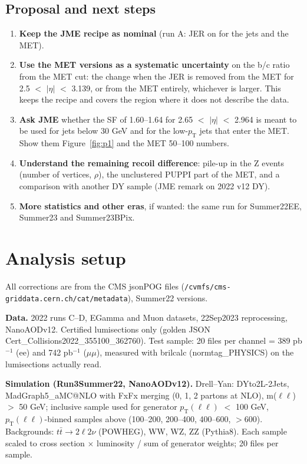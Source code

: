 \documentclass[11pt,a4paper]{article}
\newcommand{\pt}{$p_\mathrm{T}$}
\newcommand{\aeta}{$|\eta|$}
\begin{document}
\subsection{Proposal and next steps}
\begin{enumerate}
\item \textbf{Keep the JME recipe as nominal} (run A: JER on for the jets and the MET).
\item \textbf{Use the MET versions as a systematic uncertainty} on the b/c ratio from the MET cut: the change when the JER is removed
from the MET for 2.5 $<$ \aeta{} $<$ 3.139, or from the MET entirely, whichever is larger. This keeps the recipe and covers the region
where it does not describe the data.
\item \textbf{Ask JME} whether the SF of 1.60--1.64 for 2.65 $<$ \aeta{} $<$ 2.964 is meant to be used for jets below 30 GeV and for
the low-\pt{} jets that enter the MET. Show them Figure~\ref{fig:p1} and the MET 50--100 numbers.
\item \textbf{Understand the remaining recoil difference}: pile-up in the Z events (number of vertices, $\rho$), the unclustered PUPPI part
of the MET, and a comparison with another DY sample (JME remark on 2022 v12 DY).
\item \textbf{More statistics and other eras}, if wanted: the same run for Summer22EE, Summer23 and Summer23BPix.
\end{enumerate}

\appendix
\sloppy
\section{Analysis setup}
\label{app:setup}
All corrections are from the CMS jsonPOG files (\texttt{/cvmfs/cms-griddata.cern.ch/cat/metadata}), Summer22 versions.

\textbf{Data.} 2022 runs C--D, EGamma and Muon datasets, 22Sep2023 reprocessing, NanoAODv12. Certified lumisections only (golden JSON
Cert\_Collisions2022\_355100\_362760). Test sample: 20 files per channel = 389 pb$^{-1}$ (ee) and 742 pb$^{-1}$ ($\mu\mu$), measured with
brilcalc (normtag\_PHYSICS) on the lumisections actually read.

\textbf{Simulation (Run3Summer22, NanoAODv12).} Drell--Yan: DYto2L-2Jets, MadGraph5\_aMC@NLO with FxFx merging (0, 1, 2 partons at NLO),
m($\ell\ell$) $>$ 50 GeV; inclusive sample used for generator $p_\mathrm{T}(\ell\ell)$ $<$ 100 GeV, $p_\mathrm{T}(\ell\ell)$-binned samples
above (100--200, 200--400, 400--600, $>$600). Backgrounds: $t\bar t\to 2\ell2\nu$ (POWHEG), WW, WZ, ZZ (Pythia8). Each sample scaled to
cross section $\times$ luminosity / sum of generator weights; 20 files per sample.
\end{document}
